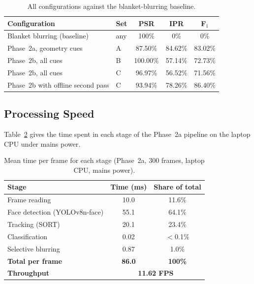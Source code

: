 \begin{table}[htbp]
\begin{singlespace}
\centering
\caption{All configurations against the blanket-blurring baseline.}
\label{tab:vs_baseline}
\renewcommand{\arraystretch}{1.3}
\begin{tabular}{@{}llccc@{}}
\toprule
\textbf{Configuration} & \textbf{Set} & \textbf{PSR} & \textbf{IPR} & \textbf{F$_1$} \\
\midrule
Blanket blurring (baseline)      & any & 100\%    & 0\%     & 0\% \\
Phase~2a, geometry cues          & A   & 87.50\%  & 84.62\% & 83.02\% \\
Phase~2b, all cues               & B   & 100.00\% & 57.14\% & 72.73\% \\
Phase~2b, all cues               & C   & 96.97\%  & 56.52\% & 71.56\% \\
Phase~2b with offline second pass & C  & 93.94\%  & 78.26\% & 86.40\% \\
\bottomrule
\end{tabular}
\end{singlespace}
\end{table}

\subsection{Processing Speed}
\label{sec:fps}

Table~\ref{tab:fps} gives the time spent in each stage of the Phase~2a pipeline on the
laptop CPU under mains power.

\begin{table}[htbp]
\begin{singlespace}
\centering
\caption{Mean time per frame for each stage (Phase~2a, 300 frames, laptop CPU, mains power).}
\label{tab:fps}
\renewcommand{\arraystretch}{1.3}
\begin{tabular}{@{}lcc@{}}
\toprule
\textbf{Stage} & \textbf{Time (ms)} & \textbf{Share of total} \\
\midrule
Frame reading                  & 10.0  & 11.6\% \\
Face detection (YOLOv8n-face)  & 55.1  & 64.1\% \\
Tracking (SORT)                & 20.1  & 23.4\% \\
Classification                 & 0.02  & $<$0.1\% \\
Selective blurring             & 0.87  & 1.0\% \\
\midrule
\textbf{Total per frame}       & \textbf{86.0} & \textbf{100\%} \\
\textbf{Throughput}            & \multicolumn{2}{c}{\textbf{11.62 FPS}} \\
\bottomrule
\end{tabular}
\end{singlespace}
\end{table}

